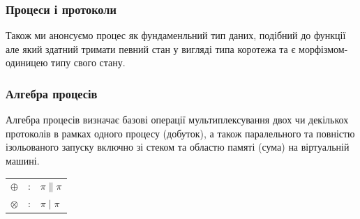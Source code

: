 \documentclass[11pt,oneside]{article}
\begin{document}
  \subsubsection*{Процеси і протоколи}
  Також ми анонсуємо процес як фундаменльний тип даних, подібний до функції але який здатний
  тримати певний стан у вигляді типа коротежа та є морфізмом-одиницею типу свого стану.

\begin{prooftree}
\end{prooftree}

\begin{prooftree}
\end{prooftree}

\begin{prooftree}
\end{prooftree}

\paragraph{}


  \subsubsection*{Алгебра процесів}

  Алгебра процесів визначає базові операції мультиплексування двох чи декількох
  протоколів в рамках одного процесу (добуток), а також паралельного та повністю
  ізольованого запуску включно зі стеком та областю памяті (сума) на
  віртуальній машині.

\begin{center}
\begin{tabular}{lcl}
$\oplus$   &:& $\pi \parallel \pi$\\
$\otimes$  &:& $\pi \mid \pi$\\
\end{tabular}
\end{center}
\end{document}
